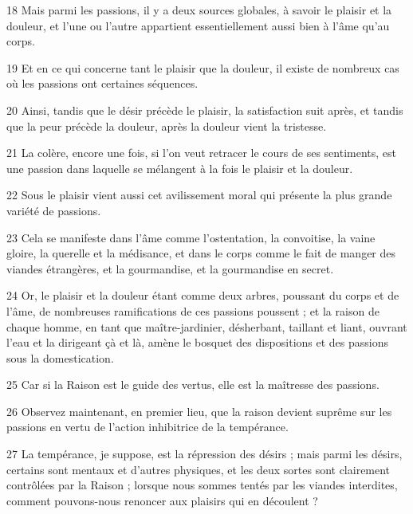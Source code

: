 \par 18 Mais parmi les passions, il y a deux sources globales, à savoir le plaisir et la douleur, et l'une ou l'autre appartient essentiellement aussi bien à l'âme qu'au corps.

\par 19 Et en ce qui concerne tant le plaisir que la douleur, il existe de nombreux cas où les passions ont certaines séquences.

\par 20 Ainsi, tandis que le désir précède le plaisir, la satisfaction suit après, et tandis que la peur précède la douleur, après la douleur vient la tristesse.

\par 21 La colère, encore une fois, si l'on veut retracer le cours de ses sentiments, est une passion dans laquelle se mélangent à la fois le plaisir et la douleur.

\par 22 Sous le plaisir vient aussi cet avilissement moral qui présente la plus grande variété de passions.

\par 23 Cela se manifeste dans l'âme comme l'ostentation, la convoitise, la vaine gloire, la querelle et la médisance, et dans le corps comme le fait de manger des viandes étrangères, et la gourmandise, et la gourmandise en secret.

\par 24 Or, le plaisir et la douleur étant comme deux arbres, poussant du corps et de l'âme, de nombreuses ramifications de ces passions poussent ; et la raison de chaque homme, en tant que maître-jardinier, désherbant, taillant et liant, ouvrant l'eau et la dirigeant çà et là, amène le bosquet des dispositions et des passions sous la domestication.

\par 25 Car si la Raison est le guide des vertus, elle est la maîtresse des passions.

\par 26 Observez maintenant, en premier lieu, que la raison devient suprême sur les passions en vertu de l'action inhibitrice de la tempérance.

\par 27 La tempérance, je suppose, est la répression des désirs ; mais parmi les désirs, certains sont mentaux et d'autres physiques, et les deux sortes sont clairement contrôlées par la Raison ; lorsque nous sommes tentés par les viandes interdites, comment pouvons-nous renoncer aux plaisirs qui en découlent ?

